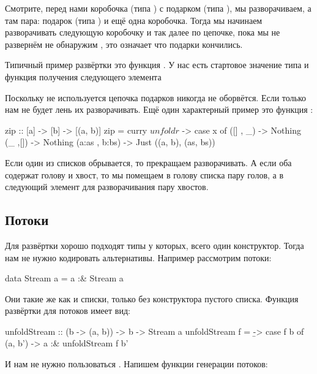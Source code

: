 Смотрите, перед нами коробочка (типа ) с подарком (типа ), 
мы разворачиваем, а там пара: подарок (типа ) и ещё одна коробочка. Тогда
мы начинаем разворачивать следующую коробочку и так далее по цепочке,
пока мы не развернём не обнаружим , это означает
что подарки кончились.


Типичный пример развёртки это функция . 
У нас есть стартовое значение типа  и функция
получения следующего элемента 


Поскольку  не используется цепочка подарков 
никогда не оборвётся. Если только нам не будет лень их
разворачивать. Ещё один характерный пример это 
функция :

\begin{code}
zip :: [a] -> [b] -> [(a, b)]
zip = curry $ unfoldr $ \x -> case x of
    ([]     , _)     -> Nothing
    (_      ,[])     -> Nothing
    (a:as   , b:bs)  -> Just ((a, b), (as, bs)) 
\end{code}

Если один из списков обрывается, то прекращаем разворачивать.
А если оба содержат голову и хвост, то мы помещаем в голову списка
пару голов, а в следующий элемент для разворачивания пару хвостов.

\subsection{Потоки}

Для развёртки хорошо подходят типы у которых, всего один
конструктор. Тогда нам не нужно кодировать альтернативы.
Например рассмотрим потоки:

\begin{code}
data Stream a = a :& Stream a
\end{code}

Они такие же как и списки, только без конструктора пустого списка.
Функция развёртки для потоков имеет вид:

\begin{code}
unfoldStream :: (b -> (a, b)) -> b -> Stream a
unfoldStream f  = \b -> case f b of
    (a, b') -> a :& unfoldStream f b'
\end{code}

И нам не нужно пользоваться . 
Напишем функции генерации потоков:

